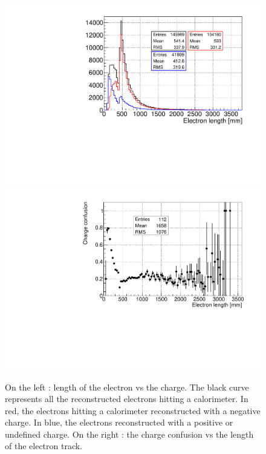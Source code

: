 \documentclass[main.tex]{subfiles}
\begin{document}
\begin{figure}[h!]
\begin{center}
\includegraphics[scale=0.35]{pictures/Chap5/length_tracker_charge_confusion_2.pdf}
\includegraphics[scale=0.35]{pictures/Chap5/charge_confusion_length_tracker.pdf}
\caption{On the left : length of the electron vs the charge. The black curve represents all the reconstructed electrons hitting a calorimeter. In red, the electrons hitting a calorimeter reconstructed with a negative charge. In blue, the electrons reconstructed with a positive or undefined charge. On the right : the charge confusion vs the length of the electron track.}
\label{charge_confusion_tracker_plots}
\end{center}
\end{figure}
\end{document}

